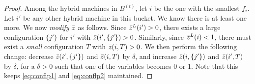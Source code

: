 \documentclass{article}[11pt]
\newcommand{\barcalS}{\bar{\cal S}\xspace}
\newcommand{\brt}{{(t)}}
\begin{document}
\begin{proof}
	Among the hybrid machines in $B^\brt$, let $i$  be the one with the smallest $f_i$. Let $i'$ be any other hybrid machine in this bucket. We know there is at least one more.
	We now \emph{modify} $\bar z$ as follows.
	Since $\bar z^L(i') > 0$, there exists a large configuration $\{j'\}$ for $i'$ with $\bar z(i',\{j'\}) > 0$. Similarly, since $\bar z^L(i) < 1$, there must exist a {\em small} configuration $T$ with $\bar z(i,T) > 0$.
	We then perform the following change: decrease $\bar z(i',\{j'\})$ and $\bar z(i,T)$ by $\delta$, and increase $\bar z(i,\{j'\})$ and $\bar z(i',T)$ by $\delta$,  for a $\delta > 0$ such that one of the variables becomes 0 or 1.
	Note that this keeps \eqref{eq:conflp1} and \eqref{eq:conflp2} maintained. 	%
	

\end{proof}
\end{document}
